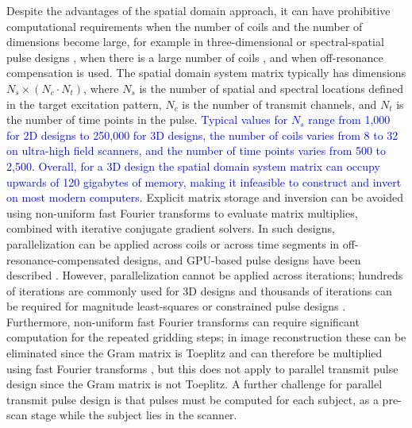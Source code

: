 \par Despite the advantages of the spatial domain approach, 
it can have prohibitive computational requirements when the number of coils and the number of dimensions become large, 
for example in three-dimensional \cite{malik2012tailored,davids2016fast} or spectral-spatial pulse designs \cite{stenger2000three,setsompop2009,Malik:2010aa,yang2010four}, 
when there is a large number of coils \cite{orzada:2019},
and when off-resonance compensation is used.  
The spatial domain system matrix typically has dimensions $N_s \times (N_c \cdot N_t)$, 
where $N_s$ is the number of spatial and spectral locations defined in the target excitation pattern,
$N_c$ is the number of transmit channels, and $N_t$ is the number of time points in the pulse.
\textcolor{blue}{Typical values for $N_s$ range from 1,000 for 2D designs to 250,000 for 3D designs,
the number of coils varies from 8 to 32 on ultra-high field scanners,
and the number of time points varies from 500 to 2,500. 
Overall, for a 3D design the spatial domain system matrix can occupy upwards of 120 gigabytes of memory,
making it infeasible to construct and invert on most modern computers. } 
Explicit matrix storage and inversion can be avoided using non-uniform fast Fourier transforms to evaluate matrix multiplies,
combined with iterative conjugate gradient solvers. 
In such designs, parallelization can be applied across coils or across time segments in off-resonance-compensated designs,
and GPU-based pulse designs have been described \cite{deng:2011}. 
However, parallelization cannot be applied across iterations;
hundreds of iterations are commonly used for 3D designs and thousands of iterations can be required for 
magnitude least-squares \cite{setsompop2008magnitude} 
or constrained pulse designs \cite{brunner2010optimal,hoyos:tmi:2014}. 
Furthermore, non-uniform fast Fourier transforms can require significant computation for the repeated gridding steps; 
in image reconstruction these can be eliminated since the Gram matrix is Toeplitz and can therefore be multiplied using fast Fourier transforms \cite{fessler2005toeplitz},
but this does not apply to parallel transmit pulse design since the Gram matrix is not Toeplitz. 
A further challenge for parallel transmit pulse design is that pulses must be computed for each subject,
as a pre-scan stage while the subject lies in the scanner. 

